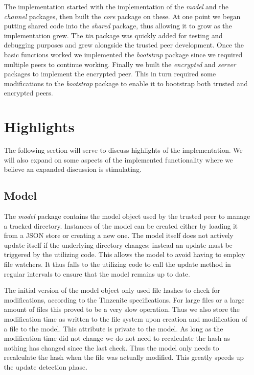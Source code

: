 The implementation started with the implementation of the \emph{model} and the \emph{channel} packages, then built the \emph{core} package on these.
At one point we began putting shared code into the \emph{shared} package, thus allowing it to grow as the implementation grew.
The \emph{tin} package was quickly added for testing and debugging purposes and grew alongside the trusted peer development.
Once the basic functions worked we implemented the \emph{bootstrap} package since we required multiple peers to continue working.
Finally we built the \emph{encrypted} and \emph{server} packages to implement the encrypted peer.
This in turn required some modifications to the \emph{bootstrap} package to enable it to bootstrap both trusted and encrypted peers.

\section{Highlights}
\label{sec:Highlights}

The following section will serve to discuss highlights of the implementation.
We will also expand on some aspects of the implemented functionality where we believe an expanded discussion is stimulating.

\subsection{Model}
\label{sub:Model}

The \emph{model} package contains the model object used by the trusted peer to manage a tracked directory.
Instances of the model can be created either by loading it from a JSON store or creating a new one.
The model itself does not actively update itself if the underlying directory changes: instead an update must be triggered by the utilizing code.
This allows the model to avoid having to employ file watchers.
It thus falls to the utilizing code to call the update method in regular intervals to ensure that the model remains up to date.

The initial version of the model object only used file hashes to check for modifications, according to the Tinzenite specifications.
For large files or a large amount of files this proved to be a very slow operation.
Thus we also store the modification time as written to the file system upon creation and modification of a file to the model.
This attribute is private to the model.
As long as the modification time did not change we do not need to recalculate the hash as nothing has changed since the last check.
Thus the model only needs to recalculate the hash when the file was actually modified.
This greatly speeds up the update detection phase.

